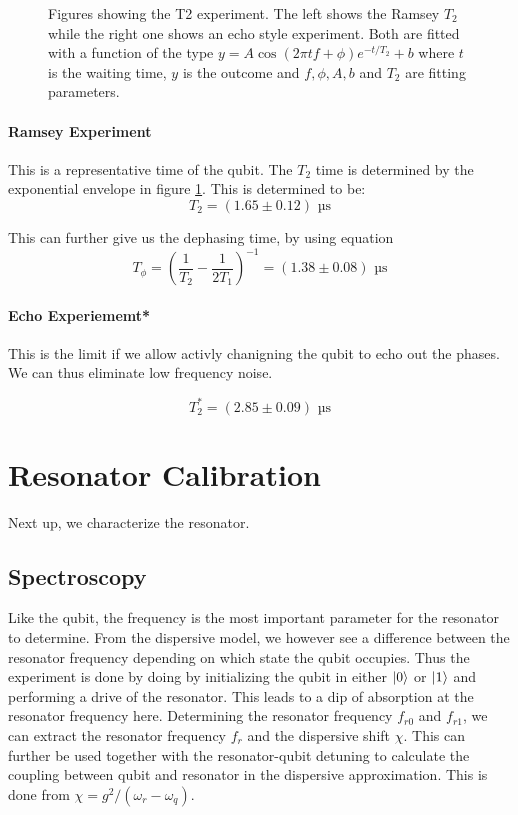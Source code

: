 \begin{figure}[t]
    \caption{Figures showing the T2 experiment. The left shows the Ramsey $T_2$ while the right one shows an echo style experiment. Both are fitted with a function of the type $y = A \cos(2 \pi t f + \phi) e^{-t / T_2} + b$ where $t$ is the waiting time, $y$ is the outcome and $f, \phi, A, b$ and $T_2$ are fitting parameters.}
    \label{fig:calibrations_t2}
\end{figure}

\paragraph{Ramsey Experiment}
This is a representative time of the qubit.
The $T_2$ time is determined by the exponential envelope in figure \ref{fig:calibrations_t2}. This is determined to be:
\begin{equation}
    T_2 = (1.65 \pm 0.12) \text{ µs} 
\end{equation}

This can further give us the dephasing time, by using equation 
\begin{equation}
    T_\phi = \left(\frac{1}{T_2} - \frac{1}{2T_1} \right)^{-1} = (1.38 \pm 0.08) \text{ µs}
\end{equation}

\paragraph{Echo Experiememt*}
This is the limit if we allow activly chanigning the qubit to echo out the phases. We can thus eliminate low frequency noise.

\begin{equation}
    T_2^* = (2.85 \pm 0.09) \text{ µs} 
\end{equation}


\section{Resonator Calibration}
Next up, we characterize the resonator.

\subsection{Spectroscopy}
 Like the qubit, the frequency is the most important parameter for the resonator to determine. From the dispersive model, we however see a difference between the resonator frequency depending on which state the qubit occupies. Thus the experiment is done by doing by initializing the qubit in either $\ket{0}$ or $\ket{1}$ and performing a drive of the resonator. This leads to a dip of absorption at the resonator frequency here. Determining the resonator frequency $f_{r0}$ and $f_{r1}$, we can extract the resonator frequency $f_r$ and the dispersive shift $\chi$. This can further be used together with the resonator-qubit detuning to calculate the coupling between qubit and resonator in the dispersive approximation. This is done from $\chi = g^2 / (\omega_r - \omega_q)$.

